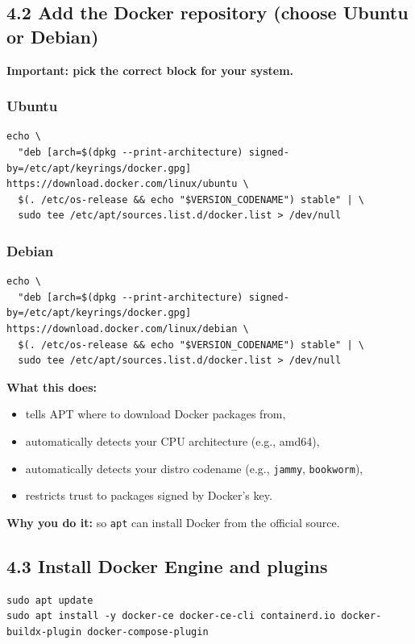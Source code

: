 \subsection{4.2 Add the Docker repository (choose Ubuntu or Debian)}
\textbf{Important: pick the correct block for your system.}

\subsubsection*{Ubuntu}
\begin{lstlisting}
echo \
  "deb [arch=$(dpkg --print-architecture) signed-by=/etc/apt/keyrings/docker.gpg] https://download.docker.com/linux/ubuntu \
  $(. /etc/os-release && echo "$VERSION_CODENAME") stable" | \
  sudo tee /etc/apt/sources.list.d/docker.list > /dev/null
\end{lstlisting}

\subsubsection*{Debian}
\begin{lstlisting}
echo \
  "deb [arch=$(dpkg --print-architecture) signed-by=/etc/apt/keyrings/docker.gpg] https://download.docker.com/linux/debian \
  $(. /etc/os-release && echo "$VERSION_CODENAME") stable" | \
  sudo tee /etc/apt/sources.list.d/docker.list > /dev/null
\end{lstlisting}

\textbf{What this does:}
\begin{itemize}[leftmargin=*]
  \item tells APT where to download Docker packages from,
  \item automatically detects your CPU architecture (e.g., amd64),
  \item automatically detects your distro codename (e.g., \texttt{jammy}, \texttt{bookworm}),
  \item restricts trust to packages signed by Docker's key.
\end{itemize}

\textbf{Why you do it:} so \texttt{apt} can install Docker from the official source.

\subsection{4.3 Install Docker Engine and plugins}
\begin{lstlisting}
sudo apt update
sudo apt install -y docker-ce docker-ce-cli containerd.io docker-buildx-plugin docker-compose-plugin
\end{lstlisting}

